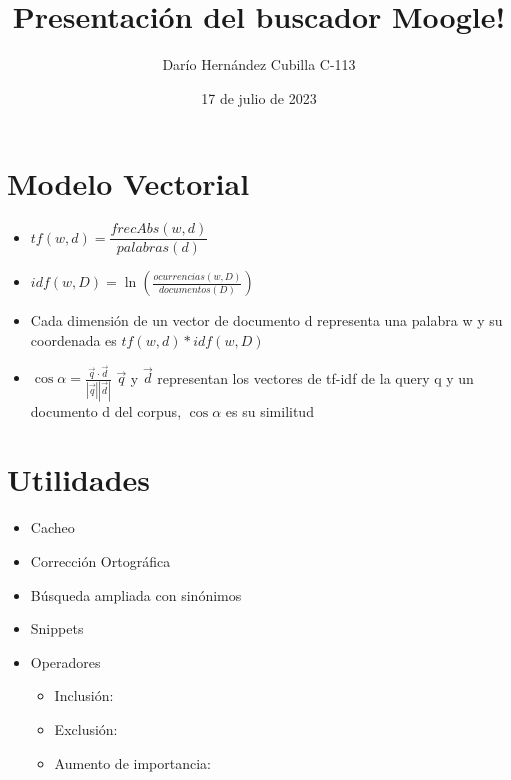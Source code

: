 \documentclass{beamer}
\begin{document}
\title{Presentación del buscador Moogle!}
\author{Darío Hernández Cubilla C-113}
\date{17 de julio de 2023}
\maketitle

\section{Modelo Vectorial}

\begin{frame}

\begin{itemize}
    \item<1-> $ \displaystyle tf(w, d) = \dfrac{frecAbs(w, d)}{palabras(d)}$
    \item<2-> $ \displaystyle idf(w, D) = \ln(\frac{ocurrencias(w, D)}{documentos(D)}) $
    \item <3-> Cada dimensión de un vector de documento d representa una palabra w y su coordenada es $ tf(w, d) * idf(w, D)$ 
    \item<4-> $ \displaystyle \cos{\alpha} = \frac{\vec{q}\cdot\vec{d}}{\left\lvert \vec{q} \right\rvert \left\lvert {\vec{d}} \right\rvert }$
             \newline  $\vec{q}$ y $\vec{d}$ representan los vectores de tf-idf de la query q y un documento d del corpus, $\cos{\alpha}$ es su similitud

\end{itemize}

\end{frame}


\section{Utilidades}

\begin{frame}
    \begin{itemize}
        \item<1-> Cacheo
        \item<2-> Corrección Ortográfica
        \item<3-> Búsqueda ampliada con sinónimos
        \item<4-> Snippets 
        \item<5-> Operadores
        \begin{itemize}
            \item<6-> Inclusión: 
            \item<7-> Exclusión: \color{red}{'!'}
            \item<8-> Aumento de importancia: \color{green}{'*'}
        \end{itemize} 
    \end{itemize}
\end{frame}
\end{document}
